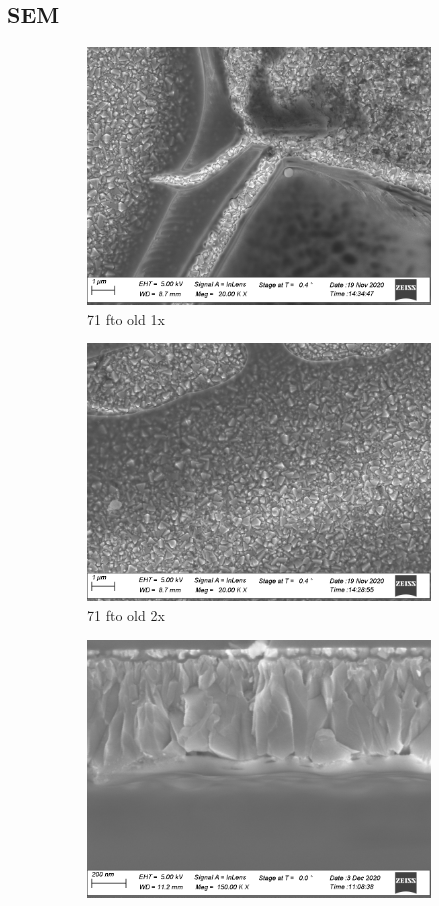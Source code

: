 \subsection{SEM}
\begin{figure}
    \centering
    \begin{subfigure}{.45\textwidth}
        \centering
        \includegraphics[width=.8\textwidth]{Pics/sem/071_fto_old_1x.png}
        \caption{71 fto old 1x} \label{fig:sem-old1}
    \end{subfigure}
    \begin{subfigure}{.45\textwidth}
        \centering
        \includegraphics[width=.8\textwidth]{Pics/sem/071_fto_old_2x.png}
        \caption{71 fto old 2x} \label{fig:sem-old2}
    \end{subfigure}
    \begin{subfigure}{.45\textwidth}
        \centering
        \includegraphics[width=.8\textwidth]{Pics/sem/115_fto_cs_1x.png}

\end{subfigure}
\end{figure}

